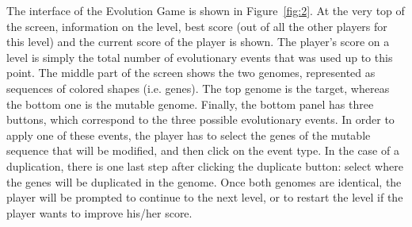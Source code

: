 \documentclass{article}
\begin{document}
The interface of the Evolution Game is shown in Figure~\ref{fig:2}. At the very top of the screen, information on the level, best score (out of all the other players for this level) and the current score of the player is shown. The player's score on a level is simply the total number of evolutionary events that was used up to this point. The middle part of the screen shows the two genomes, represented as sequences of colored shapes (i.e. genes). The top genome is the target, whereas the bottom one is the mutable genome. Finally, the bottom panel has three buttons, which correspond to the three possible evolutionary events. In order to apply one of these events, the player has to select the genes of the mutable sequence that will be modified, and then click on the event type. In the case of a duplication, there is one last step after clicking the duplicate button: select where the genes will be duplicated in the genome. Once both genomes are identical, the player will be prompted to continue to the next level, or to restart the level if the player wants to improve his/her score.



\end{document}
